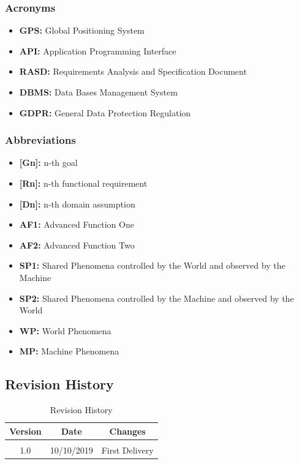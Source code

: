 \documentclass {article}
\begin{document}
		\subsubsection{Acronyms}
		
			\begin{itemize}
				\item {\bf GPS:} Global Positioning System
				\item {\bf API:} Application Programming Interface
				\item {\bf RASD:} Requirements Analysis and 								Specification Document
				\item {\bf DBMS:} Data Bases Management System
				\item {\bf GDPR:} General Data Protection Regulation
			\end{itemize}

				
				
		\subsubsection{Abbreviations}
		
			\begin{itemize}
				\item {\bf [Gn]:} n-th goal
				\item {\bf [Rn]:} n-th functional requirement
				\item {\bf [Dn]:} n-th domain assumption
				\item {\bf AF1:} Advanced Function One
				\item {\bf AF2:} Advanced Function Two
				\item {\bf SP1:} Shared Phenomena controlled by the 	World and observed by the Machine
				\item {\bf SP2:} Shared Phenomena controlled by the 	Machine and observed by the World
				\item {\bf WP:} World Phenomena
				\item {\bf MP:} Machine Phenomena
			\end{itemize}
			
	\subsection{Revision History}
	
	\begin{table}[ht]
		\centering
		\begin{tabular}{ccc} 
		Version & Date & Changes  \\ 
		\hline
		 \\1.0 & 10/10/2019 & First Delivery
		 \\
		\end{tabular}
		\caption{Revision History}
		\label{default}
	\end{table}
	
\end{document}
